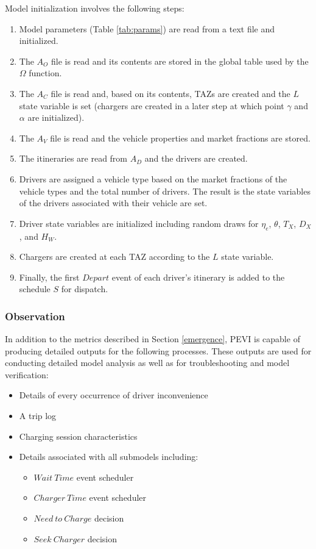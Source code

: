 \documentclass[journal]{IEEEtran}
\begin{document}
Model initialization involves the following steps:
\begin{enumerate}[label=(\alph*)]
  \item	Model parameters (Table \ref{tab:params}) are read from a text file and initialized.
  \item	The $A_O$ file is read and its contents are stored in the global table used by the $\Omega$ function. 
  \item	The $A_C$ file is read and, based on its contents, TAZs are created and the $L$ state variable is set (chargers are created in a later step at which point $\gamma$ and $\alpha$ are initialized).
  \item	The $A_V$ file is read and the vehicle properties and market fractions are stored.
  \item	The itineraries are read from $A_D$ and the drivers are created.
  \item	Drivers are assigned a vehicle type based on the market fractions of the vehicle types and the total number of drivers.  The result is the state variables of the drivers associated with their vehicle are set.
  \item	Driver state variables are initialized including random draws for $\eta_e$, $\theta$, $T_X$, $D_X$, and $H_W$.
  \item	Chargers are created at each TAZ according to the $L$ state variable.
  \item	Finally, the first $Depart$ event of each driver's itinerary is added to the schedule $S$ for dispatch.
\end{enumerate}

\subsubsection{Observation}
In addition to the metrics described in Section \ref{emergence}, PEVI is capable of producing detailed outputs for the following processes.  These outputs are used for conducting detailed model analysis as well as for troubleshooting and model verification:
\begin{itemize}
  \item	Details of every occurrence of driver inconvenience
  \item	A trip log
  \item	Charging session characteristics
  \item	Details associated with all submodels including:
  \begin{itemize}
    \item $Wait ~Time$ event scheduler
    \item $Charger ~Time$ event scheduler
    \item $Need ~to ~Charge$ decision
    \item $Seek ~Charger$ decision 
  \end{itemize}
\end{itemize}
\end{document}
